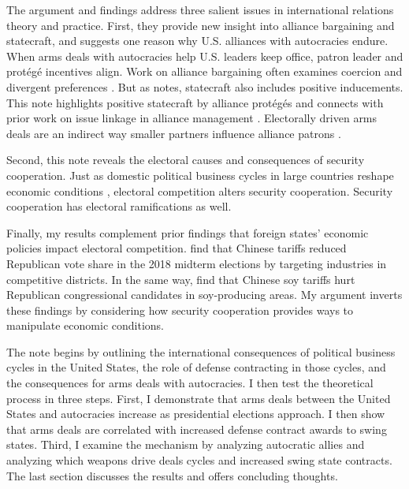 \documentclass[12pt]{article}
\begin{document}


The argument and findings address three salient issues in international relations theory and practice. 
First, they provide new insight into alliance bargaining and statecraft, and suggests one reason why U.S. alliances with autocracies endure. 
When arms deals with autocracies help U.S. leaders keep office, patron leader and prot{\'e}g{\'e} incentives align.
Work on alliance bargaining often examines coercion and divergent preferences \citep{WolfordKim2017, Resnick2019, Blankenship2020, Beckeretal2023}. %
But as \citet{Baldwin2020} notes, statecraft also includes positive inducements. 
This note highlights positive statecraft by alliance prot{\'e}g{\'e}s and connects with prior work on issue linkage in alliance management \citep{Davis2008, Poast2013}.
Electorally driven arms deals are an indirect way smaller partners influence alliance patrons \citep{Keohane1971}.


Second, this note reveals the electoral causes and consequences of security cooperation. 
Just as domestic political business cycles in large countries reshape economic conditions \citep{Kayser2006}, electoral competition alters security cooperation. 
Security cooperation has electoral ramifications as well. 


Finally, my results complement prior findings that foreign states' economic policies impact electoral competition. 
\citet{KimMargalit2021} find that Chinese tariffs reduced Republican vote share in the 2018 midterm elections by targeting industries in competitive districts.
In the same way, \citet{ChyzhUrbatsch2021} find that Chinese soy tariffs hurt Republican congressional candidates in soy-producing areas. 
My argument inverts these findings by considering how security cooperation provides ways to manipulate economic conditions. 


The note begins by outlining the international consequences of political business cycles in the United States, the role of defense contracting in those cycles, and the consequences for arms deals with autocracies. 
I then test the theoretical process in three steps. 
First, I demonstrate that arms deals between the United States and autocracies increase as presidential elections approach. 
I then show that arms deals are correlated with increased defense contract awards to swing states.
Third, I examine the mechanism by analyzing autocratic allies and analyzing which weapons drive deals cycles and increased swing state contracts.
The last section discusses the results and offers concluding thoughts.
\end{document}
